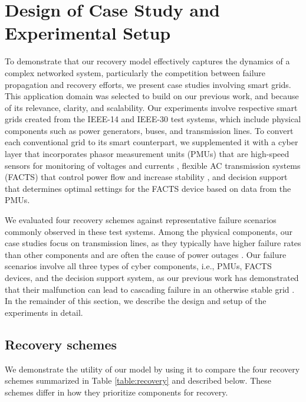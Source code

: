 \documentclass[conference]{IEEEtran}
\begin{document}
\section{Design of Case Study and Experimental Setup}\label{sec:design}
To demonstrate that our recovery model effectively captures the dynamics of a complex networked system, particularly the competition between failure propagation and recovery efforts, we present case studies involving smart grids. This application domain was selected to build on our previous work, and because of its relevance, clarity, and scalability. Our experiments involve respective smart grids created from the IEEE-14 and IEEE-30 test systems, which include physical components such as power generators, buses, and transmission lines. To convert each conventional grid to its smart counterpart, we supplemented it with a cyber layer that incorporates phasor measurement units (PMUs) that are high-speed sensors for monitoring of voltages and currents \cite{asprou_optimal_2011}, flexible AC transmission systems (FACTS) that control power flow and increase stability \cite{sosnina_assessment_2022, garrido_location_2019}, and  decision support that determines optimal settings for the FACTS device based on data from the PMUs. 

We evaluated four recovery schemes against representative failure scenarios commonly observed in these test systems. Among the physical components, our case studies focus on  transmission lines, as they typically have higher failure rates than other components and are often the cause of power outages \cite{song_survey_2013}. Our failure scenarios involve all three types of cyber components, i.e., PMUs, FACTS devices, and the decision support system, as our previous work has demonstrated that their malfunction can lead to cascading failure in an otherwise stable grid \cite{FaS10a}. In the remainder of this section, we describe the design and setup of the experiments in detail. 

\subsection{Recovery schemes}
We demonstrate the utility of our model by using it to compare the four recovery schemes summarized in Table \ref{table:recovery} and described below. These schemes differ in how they prioritize components for recovery. 
\end{document}
